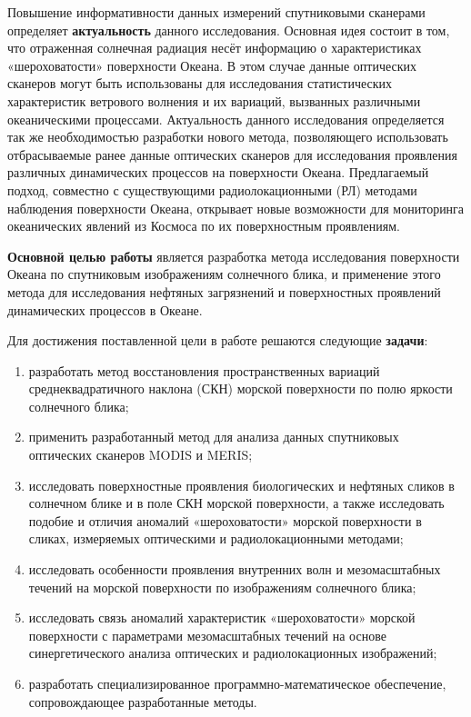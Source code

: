 Повышение информативности данных измерений спутниковыми сканерами определяет \textbf{актуальность} данного исследования. Основная идея состоит в том, что отраженная солнечная радиация несёт информацию о характеристиках «шероховатости» поверхности Океана. В этом случае данные оптических сканеров могут быть использованы для исследования статистических характеристик ветрового волнения и их вариаций, вызванных различными океаническими процессами. Актуальность данного исследования определяется так же необходимостью разработки нового метода, позволяющего использовать отбрасываемые ранее данные оптических сканеров для исследования проявления различных динамических процессов на поверхности Океана. Предлагаемый подход, совместно с существующими радиолокационными (РЛ) методами наблюдения поверхности Океана, открывает новые возможности для мониторинга океанических явлений из Космоса по их поверхностным проявлениям.

\textbf{Основной целью работы} является разработка метода исследования поверхности Океана по спутниковым изображениям солнечного блика, и применение этого метода для исследования нефтяных загрязнений и поверхностных проявлений динамических процессов в Океане.

Для достижения поставленной цели в работе решаются следующие \textbf{задачи}:

\begin{enumerate}
\item  разработать метод восстановления пространственных вариаций среднеквадратичного наклона (СКН) морской поверхности по полю яркости солнечного блика;

\item  применить разработанный метод для анализа данных спутниковых оптических сканеров MODIS и MERIS;

\item  исследовать поверхностные проявления биологических и нефтяных сликов в солнечном блике и в поле СКН морской поверхности, а также исследовать подобие и отличия аномалий «шероховатости» морской поверхности в сликах, измеряемых оптическими и радиолокационными методами;

\item  исследовать особенности проявления внутренних волн и мезомасштабных течений на морской поверхности по изображениям солнечного блика;

\item  исследовать связь аномалий характеристик «шероховатости» морской поверхности с параметрами мезомасштабных течений на основе синергетического анализа оптических и радиолокационных изображений;

\item  разработать специализированное программно-математическое обеспечение, сопровождающее разработанные методы.
\end{enumerate}

